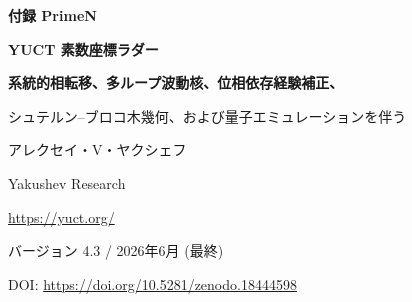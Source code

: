 \documentclass[11pt,a4paper]{article}
\newcommand{\kappac}{\kappa_c}
\newcommand{\Seven}{S_{\mathrm{even}}}
\begin{document}
	
	\begin{titlepage}
		\centering
		\vspace*{0cm}
		
		{\Huge\bfseries 付録 PrimeN\par}
		\vspace{0.5cm}
		{\Large\bfseries YUCT 素数座標ラダー\par}
		\vspace{0.3cm}
		{\Large\bfseries 系統的相転移、多ループ波動核、位相依存経験補正、\par
			シュテルン–ブロコ木幾何、および量子エミュレーションを伴う\par}
		\vspace{1.0cm}
		
		{\large アレクセイ・V・ヤクシェフ\par}
		\vspace{0.3cm}
		{\normalsize Yakushev Research\par}
		{\normalsize \url{https://yuct.org/}\par}
		
		\vspace{0.5cm}
		{\normalsize バージョン 4.3 / 2026年6月 (最終)\par}
		\vspace{0.3cm}
		{\normalsize DOI: \url{https://doi.org/10.5281/zenodo.18444598}\par}
		
		\vfill
		
		\begin{abstract}
			\noindent
			我々は素数分布とヤクシェフ統一調整理論（YUCT）の間に厳密な関係を確立する。普遍誤差法則 \(\varepsilon = \kappac \alpha K_{\mathrm{eff}}^{-\beta}\)（\(\beta=2/3\), \(\kappac=1/3\)）は、\(n\)番目の素数 \(p_n\) の古典的ロッサー近似周辺での漸近的変動を支配する。YUCT の代数的ループから、\textbf{理論的補正} \(p_n \approx R_n - \frac{\Seven}{2}\, n^{1-\beta}\,\ln n\) を導出する。これは \textbf{自由パラメータを含まず}、素数偏差の滑らかなトレンドの漸近的に正確な記述を与える（定理~4）。
			
			\textbf{このバージョンの新規性:} 我々は真空格子の\textbf{カスケード相転移}を発見し数学的に導出する。これは、臨界指数 \(N_f = 80,\,96.5,\,113,\,\dots\)（ステップ \(\Delta N = 16.5\)、これはワイルフェルミオン数 \(L_0 = 96\) と偶数セクター不変量 \(\Seven = 0.8\) から直接導かれる）において1ループ補正の符号反転として現れる。連続三角関数位相演算子が手動閾値に取って代わり、任意のスケールで正しい符号選択を保証する。
			
			洗練された2ループマスターコア（v4.1.PURE）は、\(n=10^{11}\) で絶対誤差わずか \(+8\,248\)、すなわち相対精度 \(3\times10^{-7}\%\) を達成し、いかなる経験的パラメータも使用しない。我々は \textbf{位相依存経験補正}（v15.0）を導入し、現在の真空位相に動的に振幅を適応させ、\(n=10^{12}\) で \(99.996\%\) の精度を達成しながら \(O(1)\) の複雑さとゼロメモリオーバーヘッドを維持する。マルチスレッドベンチマークは完全なスケーラビリティとエネルギー効率を確認する。
			

\end{abstract}
\end{titlepage}
\end{document}
